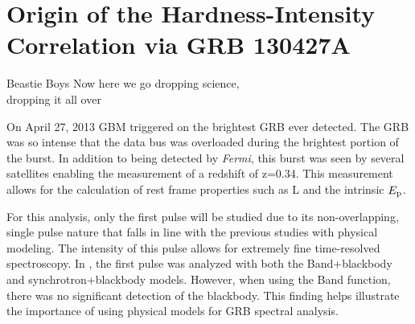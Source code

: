 
\chapter{Origin of the Hardness-Intensity Correlation via GRB 130427A}
\label{ch:130427A}
\begin{chapterquote}{Beastie Boys}
{Now here we go dropping science,\\ dropping it all over}
\end{chapterquote}


On April 27, 2013 GBM triggered on the brightest GRB ever
detected. The GRB was so intense that the data bus was overloaded
during the brightest portion of the burst. In addition to being
detected by {\it Fermi}, this burst was seen by several satellites
enabling the measurement of a redshift of z=0.34. This measurement
allows for the calculation of rest frame properties such as L and the
intrinsic $E_{\rm p}$.

For this analysis, only the first pulse will be studied due to its
non-overlapping, single pulse nature that falls in line with the
previous studies with physical modeling. The intensity of this pulse
allows for extremely fine time-resolved spectroscopy. In
\cite{preece:2013}, the first pulse was analyzed with both the
Band+blackbody and synchrotron+blackbody models. However, when using
the Band function, there was no significant detection of the
blackbody. This finding helps illustrate the importance of using
physical models for GRB spectral analysis.

